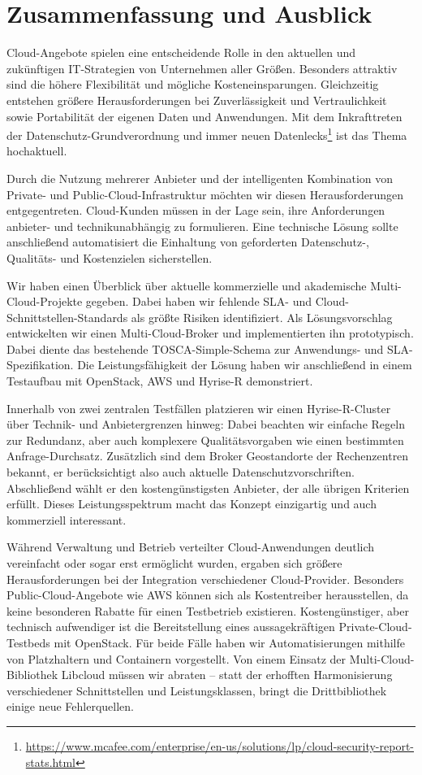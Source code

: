 \chapter{Zusammenfassung und Ausblick}

Cloud-Angebote spielen eine entscheidende Rolle in den aktuellen und zukünftigen IT-Strategien von Unternehmen aller Größen. Besonders attraktiv sind die höhere Flexibilität und mögliche Kosteneinsparungen. Gleichzeitig entstehen größere Herausforderungen bei Zuverlässigkeit und Vertraulichkeit sowie Portabilität der eigenen Daten und Anwendungen. Mit dem Inkrafttreten der Datenschutz-Grundverordnung und immer neuen Datenlecks\footnote{\url{https://www.mcafee.com/enterprise/en-us/solutions/lp/cloud-security-report-stats.html}} ist das Thema hochaktuell.

Durch die Nutzung mehrerer Anbieter und der intelligenten Kombination von Private- und Public-Cloud-Infrastruktur möchten wir diesen Herausforderungen entgegentreten. Cloud-Kunden müssen in der Lage sein, ihre Anforderungen anbieter- und technikunabhängig zu formulieren. Eine technische Lösung sollte anschließend automatisiert die Einhaltung von geforderten Datenschutz-, Qualitäts- und Kostenzielen sicherstellen.

Wir haben einen Überblick über aktuelle kommerzielle und akademische Multi-Cloud-Projekte gegeben. Dabei haben wir fehlende SLA- und Cloud-Schnittstellen-Standards als größte Risiken identifiziert. Als Lösungsvorschlag entwickelten wir einen Multi-Cloud-Broker und implementierten ihn prototypisch. Dabei diente das bestehende TOSCA-Simple-Schema zur Anwendungs- und SLA-Spezi\-fi\-ka\-tion. Die Leistungsfähigkeit der Lösung haben wir anschließend in einem Testaufbau mit OpenStack, AWS und Hyrise-R demonstriert.

Innerhalb von zwei zentralen Testfällen platzieren wir einen Hyrise-R-Cluster über Technik- und Anbietergrenzen hinweg: Dabei beachten wir einfache Regeln zur Redundanz, aber auch komplexere Qualitätsvorgaben wie einen bestimmten Anfrage-Durchsatz. Zusätzlich sind dem Broker Geostandorte der Rechenzentren bekannt, er berücksichtigt also auch aktuelle Datenschutzvorschriften. Abschließend wählt er den kostengünstigsten Anbieter, der alle übrigen Kriterien erfüllt. Dieses Leistungsspektrum macht das Konzept einzigartig und auch kommerziell interessant.

Während Verwaltung und Betrieb verteilter Cloud-Anwendungen deutlich vereinfacht oder sogar erst ermöglicht wurden, ergaben sich größere Herausforderungen bei der Integration verschiedener Cloud-Provider. Besonders Public-Cloud-Angebote wie AWS können sich als Kostentreiber herausstellen, da keine besonderen Rabatte für einen Testbetrieb existieren. Kostengünstiger, aber technisch aufwendiger ist die Bereitstellung eines aussagekräftigen Private-Cloud-Testbeds mit OpenStack. Für beide Fälle haben wir Automatisierungen mithilfe von Platzhaltern und Containern vorgestellt. Von einem Einsatz der Multi-Cloud-Bibliothek Libcloud müssen wir abraten -- statt der erhofften Harmonisierung verschiedener Schnittstellen und Leistungsklassen, bringt die Drittbibliothek einige neue Fehlerquellen.

